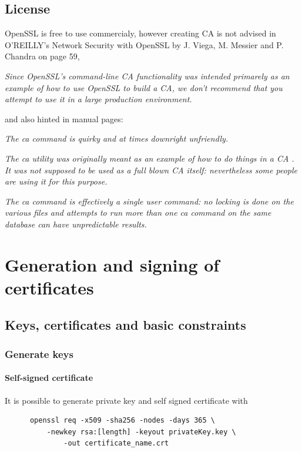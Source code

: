 \documentclass[10pt, a4paper]{report}
\begin{document}
  
  \subsection{License}
OpenSSL is free to use commercialy, however creating CA is not advised in O'REILLY's Network Security with OpenSSL by J. Viega, M. Messier and P. Chandra on page 59,
\begin{displayquote}
\textit{Since OpenSSL's command-line CA functionality was intended primarely as an example of how to use OpenSSL to build a CA, we don't recommend that you attempt to use it in a large production environment.}
\end{displayquote}
and also hinted in manual pages:
\begin{displayquote}
\textit{The ca command is quirky and at times downright unfriendly.}

\textit{The ca utility was originally meant as an example of how to do things in a CA . It was not supposed to be used as a full blown CA itself: nevertheless some people are using it for this purpose.}

\textit{The ca command is effectively a single user command: no locking is done on the various files and attempts to run more than one ca command on the same database can have unpredictable results.}

\end{displayquote}
  
\section{Generation and signing of certificates}

  \subsection{Keys, certificates and basic constraints}
  
    \subsubsection{Generate keys}
    
      \paragraph{Self-signed certificate}
      It is possible to generate private key and self signed certificate with 
      \begin{verbatim}
      openssl req -x509 -sha256 -nodes -days 365 \
	      -newkey rsa:[length] -keyout privateKey.key \
              -out certificate_name.crt
      \end{verbatim}
\end{document}
